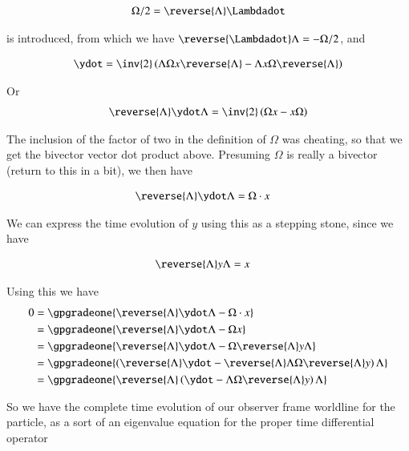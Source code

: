 \begin{align}
\Omega/2 = \reverse{\Lambda} \Lambdadot
\end{align}

is introduced, from which we have $\reverse{\Lambdadot} \Lambda = -\Omega/2$, and

\begin{align*}
\ydot &= \inv{2} \left( \Lambda \Omega x \reverse{\Lambda} - \Lambda x \Omega \reverse{\Lambda} \right) \\
\end{align*}

Or
\begin{align*}
\reverse{\Lambda} \ydot \Lambda &= \inv{2} \left( \Omega x - x \Omega \right) \\
\end{align*}

The inclusion of the factor of two in the definition of $\Omega$ was cheating, so that we get the bivector vector dot product above.  Presuming $\Omega$ is really a bivector (return to this in a bit), we then have

\begin{align}
\reverse{\Lambda} \ydot \Lambda &= \Omega \cdot x 
\end{align}

We can express the time evolution of $y$ using this as a stepping stone, since we have

\begin{align*}
\reverse{\Lambda} y \Lambda &= x 
\end{align*}

Using this we have
\begin{align*}
0 
&= \gpgradeone{ \reverse{\Lambda} \ydot \Lambda - \Omega \cdot x } \\
&= \gpgradeone{ \reverse{\Lambda} \ydot \Lambda - \Omega x } \\
&= \gpgradeone{ \reverse{\Lambda} \ydot \Lambda - \Omega \reverse{\Lambda} y \Lambda } \\
&= \gpgradeone{ \left( \reverse{\Lambda} \ydot - \reverse{\Lambda} \Lambda \Omega \reverse{\Lambda} y \right) \Lambda } \\
&= \gpgradeone{ \reverse{\Lambda} \left( \ydot - \Lambda \Omega \reverse{\Lambda} y \right) \Lambda } \\
\end{align*}

So we have the complete time evolution of our observer frame worldline for the particle, as a sort of an eigenvalue 
equation for the proper time differential operator


